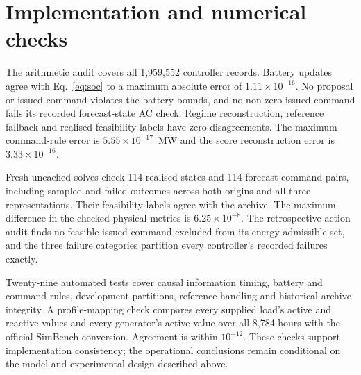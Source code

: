 \documentclass[preprint,12pt]{elsarticle}
\begin{document}
\appendix
\section{Implementation and numerical checks}\label{sec:checks}
The arithmetic audit covers all 1,959,552 controller records. Battery updates agree with Eq.~\eqref{eq:soc} to a maximum absolute error of $1.11\times10^{-16}$. No proposal or issued command violates the battery bounds, and no non-zero issued command fails its recorded forecast-state AC check. Regime reconstruction, reference fallback and realised-feasibility labels have zero disagreements. The maximum command-rule error is $5.55\times10^{-17}$~MW and the score reconstruction error is $3.33\times10^{-16}$.

Fresh uncached solves check 114 realised states and 114 forecast-command pairs, including sampled and failed outcomes across both origins and all three representations. Their feasibility labels agree with the archive. The maximum difference in the checked physical metrics is $6.25\times10^{-8}$. The retrospective action audit finds no feasible issued command excluded from its energy-admissible set, and the three failure categories partition every controller's recorded failures exactly.

Twenty-nine automated tests cover causal information timing, battery and command rules, development partitions, reference handling and historical archive integrity. A profile-mapping check compares every supplied load's active and reactive values and every generator's active value over all 8,784 hours with the official SimBench conversion. Agreement is within $10^{-12}$. These checks support implementation consistency; the operational conclusions remain conditional on the model and experimental design described above.
\end{document}

